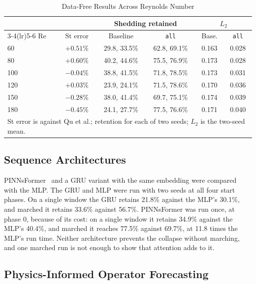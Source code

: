 \documentclass[conference]{IEEEtran}
\newcommand{\Rey}{\mathrm{Re}}
\newcommand{\St}{\mathrm{St}}
\begin{document}
\begin{table}[!t]
\centering
\caption{Data-Free Results Across Reynolds Number}
\label{tab:resweep}
\setlength{\tabcolsep}{3.5pt}
\begin{tabular}{lccccc}
\toprule
 & & \multicolumn{2}{c}{Shedding retained} & \multicolumn{2}{c}{$L_2$} \\
\cmidrule(lr){3-4}\cmidrule(lr){5-6}
$\Rey$ & $\St$ error & Baseline & \texttt{all} & Base. & \texttt{all} \\
\midrule
60  & $+0.51\%$ & 29.8, 33.5\% & 62.8, 69.1\% & 0.163 & 0.028 \\
80  & $+0.60\%$ & 40.2, 44.6\% & 75.5, 76.9\% & 0.173 & 0.028 \\
100 & $-0.04\%$ & 38.8, 41.5\% & 71.8, 78.5\% & 0.173 & 0.031 \\
120 & $+0.03\%$ & 23.9, 24.1\% & 71.5, 78.6\% & 0.170 & 0.036 \\
150 & $-0.28\%$ & 38.0, 41.4\% & 69.7, 75.1\% & 0.174 & 0.039 \\
180 & $-0.45\%$ & 24.1, 27.7\% & 77.5, 76.6\% & 0.171 & 0.040 \\
\bottomrule
\multicolumn{6}{p{0.92\columnwidth}}{\footnotesize $\St$ error is against Qu
et al.; retention for each of two seeds; $L_2$ is the two-seed mean.}
\end{tabular}
\end{table}

\subsection{Sequence Architectures}

PINNsFormer~\cite{zhao2024pinnsformer} and a GRU variant with the same
embedding were compared with the MLP. The GRU and MLP were run with two seeds
at all four start phases. On a single window the GRU retains 21.8\% against
the MLP's 30.1\%, and marched it retains 33.6\% against 56.7\%. PINNsFormer
was run once, at phase 0, because of its cost: on a single window it retains
34.9\% against the MLP's 40.4\%, and marched it reaches 77.5\% against
69.7\%, at 11.8 times the MLP's run time. Neither architecture prevents the
collapse without marching, and one marched run is not enough to show that
attention adds to it.

\subsection{Physics-Informed Operator Forecasting}
\end{document}
